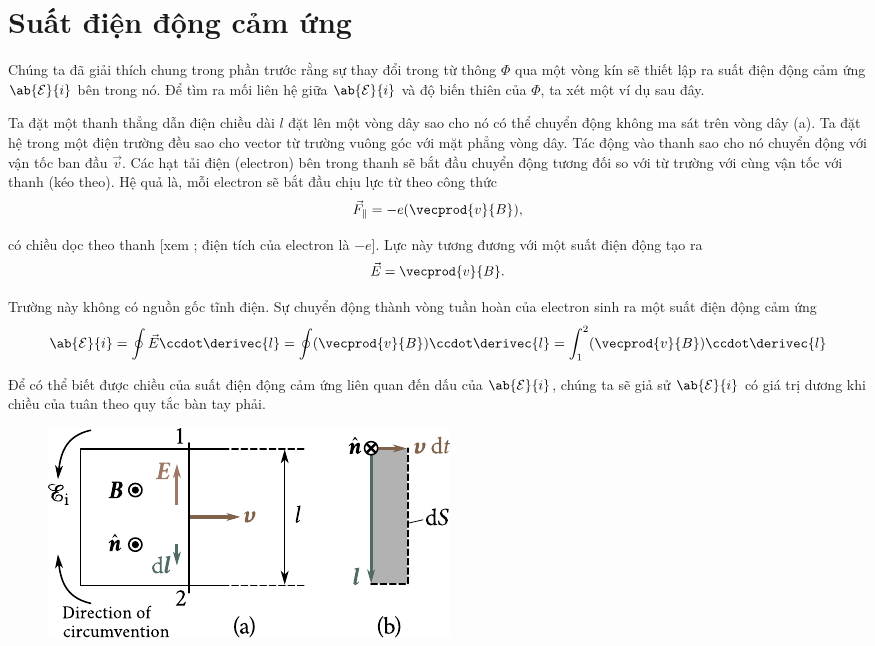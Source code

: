 \section{Suất điện động cảm ứng}\label{sec:8_2}

Chúng ta đã giải thích chung trong phần trước rằng sự thay đổi trong từ thông $\Phi$ qua một vòng kín sẽ thiết lập ra suất điện động cảm ứng $\ab{\mathcal{E}}{i}$ bên trong nó.
Để tìm ra mối liên hệ giữa $\ab{\mathcal{E}}{i}$ và độ biến thiên của $\Phi$, ta xét một ví dụ sau đây.

Ta đặt một thanh thẳng dẫn điện chiều dài $l$ đặt lên một vòng dây sao cho nó có thể chuyển động không ma sát trên vòng dây (a).
Ta đặt hệ trong một điện trường đều sao cho vector từ trường vuông góc với mặt phẳng vòng dây.
Tác động vào thanh sao cho nó chuyển động với vận tốc ban đầu $\vec{v}$.
Các hạt tải điện (electron) bên trong thanh sẽ bắt đầu chuyển động tương đối so với từ trường với cùng vận tốc với thanh (kéo theo).
Hệ quả là, mỗi electron sẽ bắt đầu chịu lực từ theo công thức
\begin{equation}\label{eq:8_1}
    \vec{F}_{\parallel} = -e (\vecprod{v}{B}),
\end{equation}

\noindent
có chiều dọc theo thanh [xem ; điện tích của electron là $-e$].
Lực này tương đương với một suất điện động tạo ra
\begin{equation*}
    \vec{E} = \vecprod{v}{B}.
\end{equation*}

\noindent
Trường này không có nguồn gốc tĩnh điện. Sự chuyển động thành vòng tuần hoàn của electron sinh ra một suất điện động cảm ứng
\begin{equation}\label{eq:8_2}
    \ab{\mathcal{E}}{i} = \oint \vec{E} \ccdot \derivec{l} = \oint (\vecprod{v}{B}) \ccdot \derivec{l} = \int_1^2 (\vecprod{v}{B}) \ccdot \derivec{l}
\end{equation}

\noindent

Để có thể biết được chiều của suất điện động cảm ứng liên quan đến dấu của $\ab{\mathcal{E}}{i}$, chúng ta sẽ giả sử $\ab{\mathcal{E}}{i}$ có giá trị dương khi chiều của tuân theo quy tắc bàn tay phải.

\begin{figure}[!h]
	\begin{center}
		\includegraphics[scale=1]{figures/ch_08/fig_8_2.pdf}
		\caption[]{}
		\label{fig:8_2}
	\end{center}
	\vspace{-0.8cm}
\end{figure}

